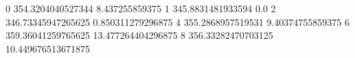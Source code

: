 0 354.3204040527344 8.437255859375
1 345.8831481933594 0.0
2 346.73345947265625 0.850311279296875
4 355.2868957519531 9.40374755859375
6 359.36041259765625 13.477264404296875
8 356.33282470703125 10.449676513671875
